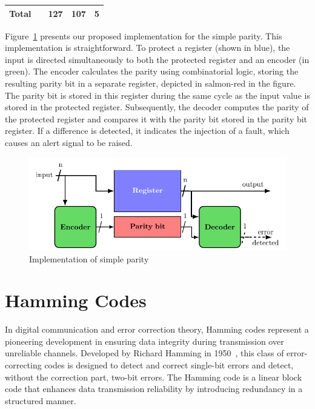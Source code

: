 \begin{table}[t]
\begin{tabular}{@{}ccccc@{}}
        Total   &                                                                                                   & 127                                                      & 107                                                                & 5                                                               \\
        \bottomrule
    \end{tabular}
\end{table}

Figure~\ref{fig:implementation_sp} presents our proposed implementation for the simple parity. This implementation is straightforward. To protect a register (shown in blue), the input is directed simultaneously to both the protected register and an encoder (in green). The encoder calculates the parity using combinatorial logic, storing the resulting parity bit in a separate register, depicted in salmon-red in the figure. The parity bit is stored in this register during the same cycle as the input value is stored in the protected register. Subsequently, the decoder computes the parity of the protected register and compares it with the parity bit stored in the parity bit register. If a difference is detected, it indicates the injection of a fault, which causes an alert signal to be raised.

\begin{figure}[ht]
    \centering
    \includegraphics[page=1]{c5_countermeasures_dift/img/archi_contremesures.pdf}
    \caption{Implementation of simple parity}
    \label{fig:implementation_sp}
\end{figure}

\section{Hamming Codes}
\label{chapter:hammingcode}

In digital communication and error correction theory, Hamming codes represent a pioneering development in ensuring data integrity during transmission over unreliable channels. Developed by Richard Hamming in 1950~\cite{H-50-bstj}, this class of error-correcting codes is designed to detect and correct single-bit errors and detect, without the correction part, two-bit errors. The Hamming code is a linear block code that enhances data transmission reliability by introducing redundancy in a structured manner.


